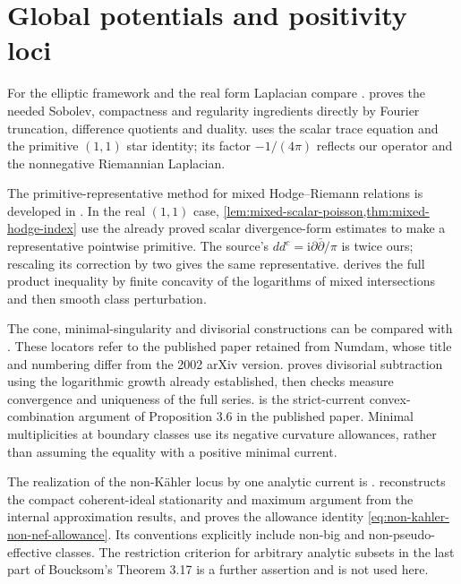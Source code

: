 \section{Global potentials and positivity loci}
\label{sec:history-global-potentials}
For the elliptic framework and the real form Laplacian compare \cite[Chapter VI, Section 2, pp.~289--290, and Sections 3.1--3.2, pp.~291--294]{DemBook}.  proves the needed Sobolev, compactness and regularity ingredients directly by Fourier truncation, difference quotients and duality.  uses the scalar trace equation and the primitive $(1,1)$ star identity; its factor $-1/(4\pi)$ reflects our operator and the nonnegative Riemannian Laplacian.

The primitive-representative method for mixed Hodge--Riemann relations is developed in \cite[Propositions 2.3--2.4 and proof of Theorem A, pp.~5--8]{DN2005mixedv2}. In the real $(1,1)$ case, \cref{lem:mixed-scalar-poisson,thm:mixed-hodge-index} use the already proved scalar divergence-form estimates to make a representative pointwise primitive. The source's $dd^c=\mathrm{i}\partial\bar\partial/\pi$ is twice ours; rescaling its correction by two gives the same representative.  derives the full product inequality by finite concavity of the logarithms of mixed intersections and then smooth class perturbation.


The cone, minimal-singularity and divisorial constructions can be compared with \cite[Sections 2.1--2.3, pp.~47--49, Sections 2.7--2.8, pp.~51--53, and Section 3.1, pp.~54--55]{Bou04}. These locators refer to the published paper retained from Numdam, whose title and numbering differ from the 2002 arXiv version.  proves divisorial subtraction using the logarithmic growth already established, then checks measure convergence and uniqueness of the full series.  is the strict-current convex-combination argument of Proposition 3.6 in the published paper. Minimal multiplicities at boundary classes use its negative curvature allowances, rather than assuming the equality with a positive minimal current.

The realization of the non-K\"ahler locus by one analytic current is \cite[Definition 3.16 and Theorem 3.17, pp.~59--60]{Bou04}.  reconstructs the compact coherent-ideal stationarity and maximum argument from the internal approximation results, and proves the allowance identity \eqref{eq:non-kahler-non-nef-allowance}. Its conventions explicitly include non-big and non-pseudo-effective classes. The restriction criterion for arbitrary analytic subsets in the last part of Boucksom's Theorem 3.17 is a further assertion and is not used here.

